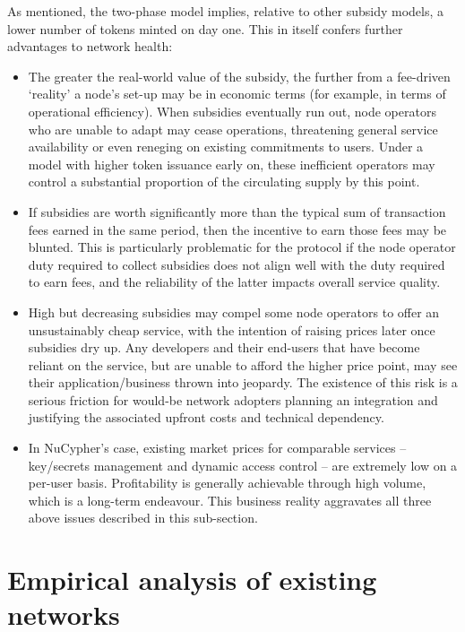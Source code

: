 \documentclass[8pt]{article}
\begin{document}
As mentioned, the two-phase model implies, relative to other subsidy models, a lower number of tokens minted on day one. This in itself confers further advantages to network health:  
\begin{itemize}
\item The greater the real-world value of the subsidy, the further from a fee-driven `reality' a node's set-up may be in economic terms (for example, in terms of operational efficiency). When subsidies eventually run out, node operators who are unable to adapt may cease operations, threatening general service availability or even reneging on existing commitments to users. Under a model with higher token issuance early on, these inefficient operators may control a substantial proportion of the circulating supply by this point. 
\item If subsidies are worth significantly more than the typical sum of transaction fees earned in the same period, then the incentive to earn those fees may be blunted. This is particularly problematic for the protocol if the node operator duty required to collect subsidies does not align well with the duty required to earn fees, and the reliability of the latter impacts overall service quality. 
\item High but decreasing subsidies may compel some node operators to offer an unsustainably cheap service, with the intention of raising prices later once subsidies dry up. Any developers and their end-users that have become reliant on the service, but are unable to afford the higher price point, may see their application/business thrown into jeopardy. The existence of this risk is a serious friction for would-be network adopters planning an integration and justifying the associated upfront costs and technical dependency.
\item In NuCypher's case, existing market prices for comparable services – key/secrets management and dynamic access control – are extremely low on a per-user basis. Profitability is generally achievable through high volume, which is a long-term endeavour. This business reality aggravates all three above issues described in this sub-section.
\end{itemize}

\section{Empirical analysis of existing networks}
\end{document}
